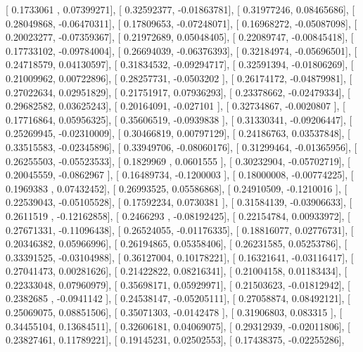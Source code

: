\documentclass{article}
\begin{document}
       [ 0.1733061 ,  0.07399271],
       [ 0.32592377, -0.01863781],
       [ 0.31977246,  0.08465686],
       [ 0.28049868, -0.06470311],
       [ 0.17809653, -0.07248071],
       [ 0.16968272, -0.05087098],
       [ 0.20023277, -0.07359367],
       [ 0.21972689,  0.05048405],
       [ 0.22089747, -0.00845418],
       [ 0.17733102, -0.09784004],
       [ 0.26694039, -0.06376393],
       [ 0.32184974, -0.05696501],
       [ 0.24718579,  0.04130597],
       [ 0.31834532, -0.09294717],
       [ 0.32591394, -0.01806269],
       [ 0.21009962,  0.00722896],
       [ 0.28257731, -0.0503202 ],
       [ 0.26174172, -0.04879981],
       [ 0.27022634,  0.02951829],
       [ 0.21751917,  0.07936293],
       [ 0.23378662, -0.02479334],
       [ 0.29682582,  0.03625243],
       [ 0.20164091, -0.027101  ],
       [ 0.32734867, -0.0020807 ],
       [ 0.17716864,  0.05956325],
       [ 0.35606519, -0.0939838 ],
       [ 0.31330341, -0.09206447],
       [ 0.25269945, -0.02310009],
       [ 0.30466819,  0.00797129],
       [ 0.24186763,  0.03537848],
       [ 0.33515583, -0.02345896],
       [ 0.33949706, -0.08060176],
       [ 0.31299464, -0.01365956],
       [ 0.26255503, -0.05523533],
       [ 0.1829969 ,  0.0601555 ],
       [ 0.30232904, -0.05702719],
       [ 0.20045559, -0.0862967 ],
       [ 0.16489734, -0.1200003 ],
       [ 0.18000008, -0.00774225],
       [ 0.1969383 ,  0.07432452],
       [ 0.26993525,  0.05586868],
       [ 0.24910509, -0.1210016 ],
       [ 0.22539043, -0.05105528],
       [ 0.17592234,  0.0730381 ],
       [ 0.31584139, -0.03906633],
       [ 0.2611519 , -0.12162858],
       [ 0.2466293 , -0.08192425],
       [ 0.22154784,  0.00933972],
       [ 0.27671331, -0.11096438],
       [ 0.26524055, -0.01176335],
       [ 0.18816077,  0.02776731],
       [ 0.20346382,  0.05966996],
       [ 0.26194865,  0.05358406],
       [ 0.26231585,  0.05253786],
       [ 0.33391525, -0.03104988],
       [ 0.36127004,  0.10178221],
       [ 0.16321641, -0.03116417],
       [ 0.27041473,  0.00281626],
       [ 0.21422822,  0.08216341],
       [ 0.21004158,  0.01183434],
       [ 0.22333048,  0.07960979],
       [ 0.35698171,  0.05929971],
       [ 0.21503623, -0.01812942],
       [ 0.2382685 , -0.0941142 ],
       [ 0.24538147, -0.05205111],
       [ 0.27058874,  0.08492121],
       [ 0.25069075,  0.08851506],
       [ 0.35071303, -0.0142478 ],
       [ 0.31906803,  0.083315  ],
       [ 0.34455104,  0.13684511],
       [ 0.32606181,  0.04069075],
       [ 0.29312939, -0.02011806],
       [ 0.23827461,  0.11789221],
       [ 0.19145231,  0.02502553],
       [ 0.17438375, -0.02255286],
\end{document}
